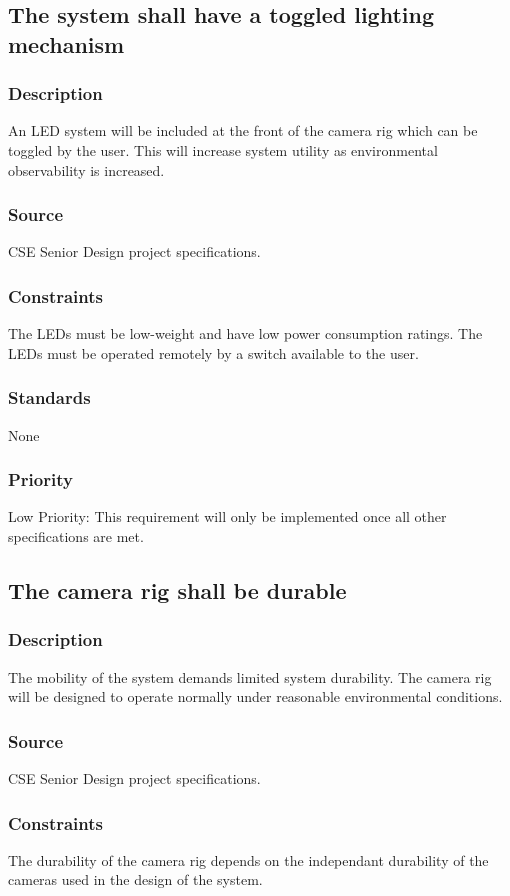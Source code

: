 \subsection{The system shall have a toggled lighting mechanism}
\subsubsection{Description}
An LED system will be included at the front of the camera rig which can be toggled by the user. This will increase system utility as environmental observability is increased. 
\subsubsection{Source}
CSE Senior Design project specifications.
\subsubsection{Constraints}
The LEDs must be low-weight and have low power consumption ratings. The LEDs must be operated remotely by a switch available to the user. 
\subsubsection{Standards}
None
\subsubsection{Priority}
Low Priority: This requirement will only be implemented once all other specifications are met. 

\subsection{The camera rig shall be durable}
\subsubsection{Description}
The mobility of the system demands limited system durability. The camera rig will be designed to operate normally under reasonable environmental conditions. 
\subsubsection{Source}
CSE Senior Design project specifications.
\subsubsection{Constraints}
The durability of the camera rig depends on the independant durability of the cameras used in the design of the system. 
